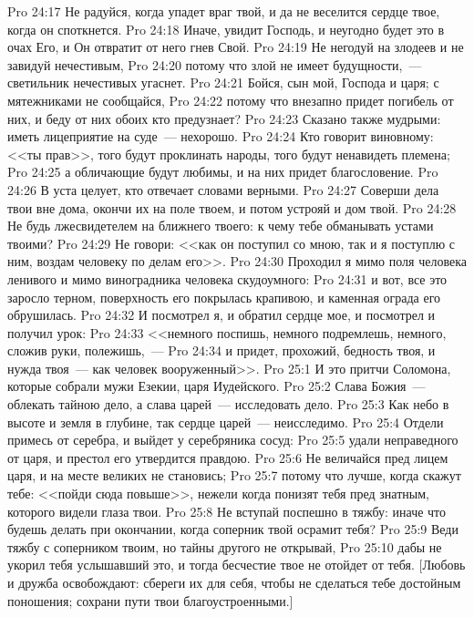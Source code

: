 \vs Pro 24:17 Не радуйся, когда упадет враг твой, и да не веселится сердце твое, когда он споткнется.
\vs Pro 24:18 Иначе, увидит Господь, и неугодно будет это в очах Его, и Он отвратит от него гнев Свой.
\vs Pro 24:19 Не негодуй на злодеев и не завидуй нечестивым,
\vs Pro 24:20 потому что злой не имеет будущности,~--- светильник нечестивых угаснет.
\vs Pro 24:21 Бойся, сын мой, Господа и царя; с мятежниками не сообщайся,
\vs Pro 24:22 потому что внезапно придет погибель от них, и беду от них обоих кто предузнает?
\vs Pro 24:23 Сказано также мудрыми: иметь лицеприятие на суде~--- нехорошо.
\vs Pro 24:24 Кто говорит виновному: <<ты прав>>, того будут проклинать народы, того будут ненавидеть племена;
\vs Pro 24:25 а обличающие будут любимы, и на них придет благословение.
\vs Pro 24:26 В уста целует, кто отвечает словами верными.
\vs Pro 24:27 Соверши дела твои вне дома, окончи их на поле твоем, и потом устрояй и дом твой.
\vs Pro 24:28 Не будь лжесвидетелем на ближнего твоего: к чему тебе обманывать устами твоими?
\vs Pro 24:29 Не говори: <<как он поступил со мною, так и я поступлю с ним, воздам человеку по делам его>>.
\vs Pro 24:30 Проходил я мимо поля человека ленивого и мимо виноградника человека скудоумного:
\vs Pro 24:31 и вот, все это заросло терном, поверхность его покрылась крапивою, и каменная ограда его обрушилась.
\vs Pro 24:32 И посмотрел я, и обратил сердце мое, и посмотрел и получил урок:
\vs Pro 24:33 <<немного поспишь, немного подремлешь, немного, сложив руки, полежишь,~---
\vs Pro 24:34 и придет,  прохожий, бедность твоя, и нужда твоя~--- как человек вооруженный>>.
\vs Pro 25:1 И это притчи Соломона, которые собрали мужи Езекии, царя Иудейского.
\vs Pro 25:2 Слава Божия~--- облекать тайною дело, а слава царей~--- исследовать дело.
\vs Pro 25:3 Как небо в высоте и земля в глубине, так сердце царей~--- неисследимо.
\vs Pro 25:4 Отдели примесь от серебра, и выйдет у серебряника сосуд:
\vs Pro 25:5 удали неправедного от царя, и престол его утвердится правдою.
\vs Pro 25:6 Не величайся пред лицем царя, и на месте великих не становись;
\vs Pro 25:7 потому что лучше, когда скажут тебе: <<пойди сюда повыше>>, нежели когда понизят тебя пред знатным, которого видели глаза твои.
\vs Pro 25:8 Не вступай поспешно в тяжбу: иначе что будешь делать при окончании, когда соперник твой осрамит тебя?
\vs Pro 25:9 Веди тяжбу с соперником твоим, но тайны другого не открывай,
\vs Pro 25:10 дабы не укорил тебя услышавший это, и тогда бесчестие твое не отойдет от тебя. [Любовь и дружба освобождают: сбереги их для себя, чтобы не сделаться тебе достойным поношения; сохрани пути твои благоустроенными.]
